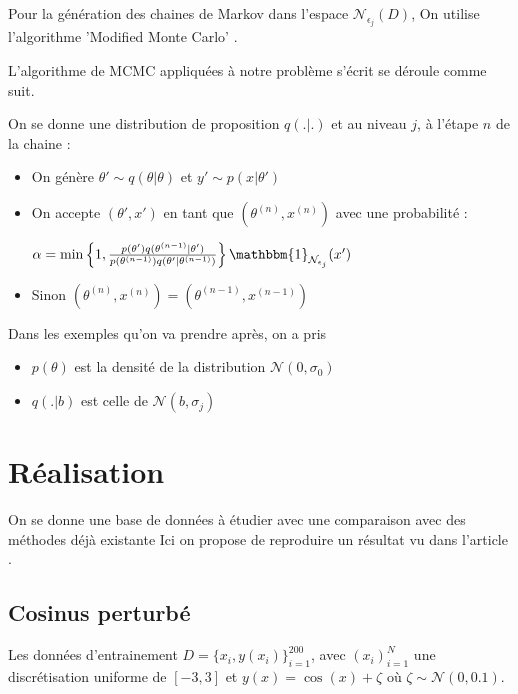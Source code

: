 \documentclass[french,12pt]{article}
\begin{document}

Pour la génération des chaines de Markov dans l'espace $\mathcal{N}_{\epsilon_{j}} (D)$, On utilise l'algorithme
'Modified Monte Carlo' \cite{Chiachio2014, Modified_MCMC}.

L'algorithme de MCMC \cite{Andrieu2003} appliquées à notre problème s'écrit se déroule comme suit.

On se donne une distribution de proposition $q(.|.)$ et au niveau $j$, à l'étape $n$ de la chaine :

\begin{itemize}
    \item On génère $\theta' \sim q(\theta | \theta)$ et $y' \sim p(x | \theta')$
    \item On accepte $(\theta', x')$ en tant que $(\theta^{(n)}, x^{(n)})$ avec une probabilité :

          $\alpha = \min \left\{ 1, \frac{p(\theta') q(\theta^{(n - 1)} | \theta')}{p(\theta^{(n - 1)}) q(\theta' | \theta^{(n-1)})}\right\}\mathbbm{1}_{\mathcal{N}_{\epsilon_j}} (x')$

    \item Sinon $(\theta^{(n)}, x^{(n)}) = (\theta^{(n-1)}, x^{(n-1)})$
\end{itemize}


Dans les exemples qu'on va prendre après, on a pris
\begin{itemize}
    \item $p(\theta)$ est la densité de la distribution $\mathcal{N}(0, \sigma_0)$
    \item $q(. | b)$ est celle de $ \mathcal{N}(b, \sigma_j)$
\end{itemize}



\pagebreak
\section{Réalisation}
On se donne une base de données à étudier avec une comparaison avec des méthodes déjà existante \cite{Chiachio2014,Fernndez2022,Uncertainty_Deep}
Ici on propose de reproduire un résultat vu dans l'article \cite{Fernndez2022}.

\subsection{Cosinus perturbé}

Les données d'entrainement $D = \{x_i , y(x_i)\}_{i = 1}^{200}$, avec $(x_i)_{i = 1}^N$
une discrétisation uniforme de $[-3, 3]$ et $y(x) = \cos(x) + \zeta$ où $\zeta \sim \mathcal{N}(0, 0.1)$.
\end{document}

